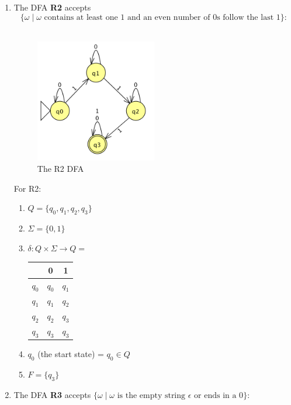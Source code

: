 \documentclass[11pt,a4paper]{article}
\begin{document}
\begin{enumerate}
            \item The DFA \textbf{R2} accepts \[ \{\omega\mid\omega\text{ contains at least one 1 and an even number of 0s follow the last 1}\}\colon\]\\
                \begin{figure}[H]
                    \centering
                    \includegraphics[width=0.50\textwidth]{A2}
                    \caption{The R2 DFA}
                \end{figure}

                For R2:
                \begin{enumerate}
                    \item $Q = \{q_0, q_1, q_2, q_3\}$
                    \item $\Sigma = \{0, 1\}$
                    \item $\delta \colon Q \times \Sigma \rightarrow Q =$
                    \begin{tabular}{c|c|c}
                         & 0 & 1 \\ \hline
                        $q_0$ & $q_0$ & $q_1$ \\ \hline
                        $q_1$ & $q_1$ & $q_2$ \\ \hline
                        $q_2$ & $q_2$ & $q_3$ \\ \hline
                        $q_3$ & $q_3$ & $q_3$ \\ \hline
                    \end{tabular}
                    \item $q_0$ (the start state) = $q_0 \in Q$
                    \item $F = \{q_3\}$
                \end{enumerate}

            \item The DFA \textbf{R3} accepts $\{\omega\mid\omega\text{ is the empty string $\epsilon$ or ends in a 0}\}$:


\end{enumerate}
\end{document}
